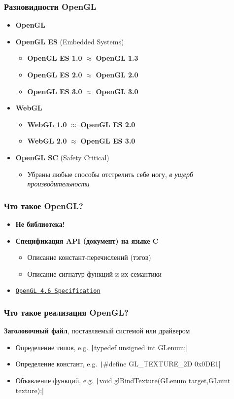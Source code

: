 \documentclass[10pt]{beamer}
\begin{document}
\begin{frame}
\frametitle{Разновидности OpenGL}
\begin{itemize}
\item \textbf{OpenGL}
\pause
\item \textbf{OpenGL ES} (Embedded Systems)
\begin{itemize}
\item \textbf{OpenGL ES 1.0} $\approx$ \textbf{OpenGL 1.3}
\item \textbf{OpenGL ES 2.0} $\approx$ \textbf{OpenGL 2.0}
\item \textbf{OpenGL ES 3.0} $\approx$ \textbf{OpenGL 3.0}
\end{itemize}
\pause
\item \textbf{WebGL}
\begin{itemize}
\item \textbf{WebGL 1.0} $\approx$ \textbf{OpenGL ES 2.0}
\item \textbf{WebGL 2.0} $\approx$ \textbf{OpenGL ES 3.0}
\end{itemize}
\pause
\item \textbf{OpenGL SC} (Safety Critical)
\begin{itemize}
\item Убраны любые способы отстрелить себе ногу, \textit{в ущерб производительности}
\end{itemize}
\end{itemize}
\end{frame}

\begin{frame}
\frametitle{Что такое OpenGL?}
\begin{itemize}
\item \textbf{{\color{red}Не} библиотека!}
\item \textbf{Спецификация API (документ) на языке C}
\begin{itemize}
\item Описание констант-перечислений (тэгов)
\item Описание сигнатур функций и их семантики
\end{itemize}
\pause
\item \href{https://registry.khronos.org/OpenGL/specs/gl/glspec46.core.pdf}{\texttt{OpenGL 4.6 Specification}}
\end{itemize}
\end{frame}

\begin{frame}[fragile]
\frametitle{Что такое реализация OpenGL?}
\pause
\textbf{Заголовочный файл}, поставляемый системой или драйвером
\begin{itemize}
\item Определение типов, e.g. \texttt|typedef unsigned int GLenum;|
\item Определение констант, e.g. \texttt|#define GL_TEXTURE_2D 0x0DE1|
\item Объявление функций, e.g. \texttt|void glBindTexture(GLenum target,GLuint texture);|
\end{itemize}
\end{frame}
\end{document}
